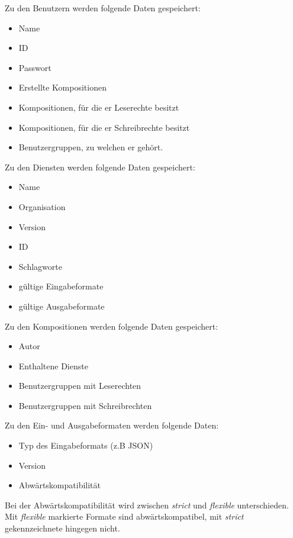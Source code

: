 Zu den Benutzern werden folgende Daten gespeichert:
\begin{itemize}
	\item Name
	\item ID
	\item Passwort
	\item Erstellte Kompositionen
	\item Kompositionen, für die er Leserechte besitzt
	\item Kompositionen, für die er Schreibrechte besitzt
	\item Benutzergruppen, zu welchen er gehört.
\end{itemize}
Zu den Diensten werden folgende Daten gespeichert:
\begin{itemize}
	\item Name
	\item Organisation
	\item Version
	\item ID
	\item Schlagworte
	\item gültige Eingabeformate
	\item gültige Ausgabeformate
\end{itemize}
Zu den Kompositionen werden folgende Daten gespeichert:
\begin{itemize}
	\item Autor
	\item Enthaltene Dienste
	\item Benutzergruppen mit Leserechten
	\item Benutzergruppen mit Schreibrechten
\end{itemize}

Zu den Ein- und Ausgabeformaten werden folgende Daten:
\begin{itemize}
	\item Typ des Eingabeformats (z.B JSON)
	\item Version
	\item Abwärtskompatibilität
\end{itemize}
Bei der Abwärtskompatibilität wird zwischen \textit{strict} und \textit{flexible} unterschieden. Mit \textit{flexible} markierte Formate sind abwärtskompatibel, mit \textit{strict} gekennzeichnete hingegen nicht.
